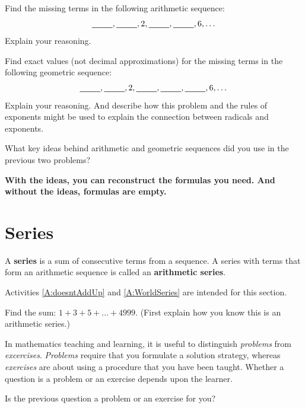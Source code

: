 \begin{question}
Find the missing terms in the following arithmetic sequence:  
$$\rule[-2pt]{25pt}{.5pt}, \rule[-2pt]{25pt}{.5pt},  2,  \rule[-2pt]{25pt}{.5pt}, \rule[-2pt]{25pt}{.5pt}, 6, \dots$$
Explain your reasoning.  
\end{question}

\begin{question}
Find exact values (not decimal approximations) for the missing terms in the following geometric sequence:  
$$\rule[-2pt]{25pt}{.5pt}, \rule[-2pt]{25pt}{.5pt},  2,  \rule[-2pt]{25pt}{.5pt},  \rule[-2pt]{25pt}{.5pt}, \rule[-2pt]{25pt}{.5pt}, 6, \dots$$
Explain your reasoning.  And describe how this problem and the rules of exponents might be used to explain the connection between radicals and exponents.  
\end{question}

\begin{question}
What key ideas behind arithmetic and geometric sequences did you use in the previous two problems? 
\end{question}

\begin{center}
\textbf{With the ideas, you can reconstruct the formulas you need.  And without the ideas, formulas are empty.}  
\end{center}

\newpage

\section{Series}  
\begin{definition}
A \textbf{series} is a sum of consecutive terms from a sequence.  A series with terms that form an arithmetic sequence is called an \textbf{arithmetic series}.  
\end{definition}

\begin{activitynote}
Activities \ref{A:doesntAddUp} and \ref{A:WorldSeries} are intended for this section.  
\end{activitynote}

\begin{question}
Find the sum:  $1 + 3 + 5 + \dots + 4999.$  (First explain how you know this is an arithmetic series.)
\end{question}
\QM

In mathematics teaching and learning, it is useful to distinguish \emph{problems} from  \emph{excercises}. \emph{Problems} require that you formulate a solution strategy, whereas \emph{exercises} are about using a procedure that you have been taught.  Whether a question is a problem or an exercise depends upon the learner.  
\begin{question}
Is the previous question a problem or an exercise for you?  
\end{question}

